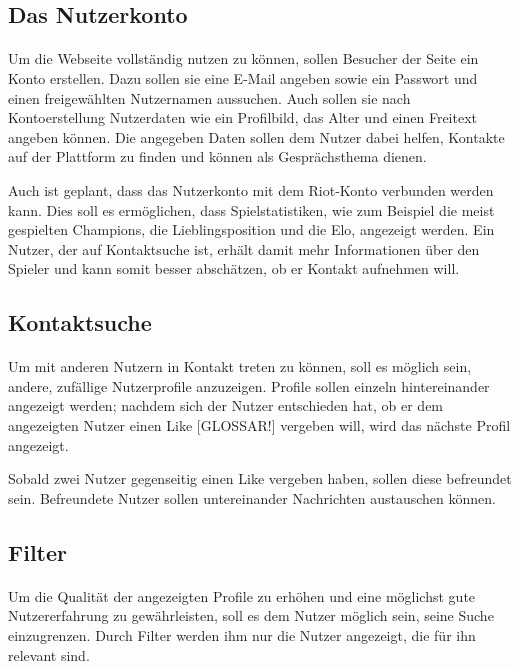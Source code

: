 \subsection{Das Nutzerkonto}
\paragraph{}
Um die Webseite vollständig nutzen zu können, sollen Besucher der Seite ein Konto erstellen. Dazu sollen sie eine E-Mail angeben sowie ein Passwort und einen freigewählten Nutzernamen aussuchen. Auch sollen sie nach Kontoerstellung Nutzerdaten wie ein Profilbild, das Alter und einen Freitext angeben können. Die angegeben Daten sollen dem Nutzer dabei helfen, Kontakte auf der Plattform zu finden und können als Gesprächsthema dienen.

Auch ist geplant, dass das Nutzerkonto mit dem Riot-Konto verbunden werden kann. Dies soll es ermöglichen, dass Spielstatistiken, wie zum Beispiel die meist gespielten Champions, die Lieblingsposition und die Elo, angezeigt werden. Ein Nutzer, der auf Kontaktsuche ist, erhält damit mehr Informationen über den Spieler und kann somit besser abschätzen, ob er Kontakt aufnehmen will. 

\subsection{Kontaktsuche}
\paragraph{}
Um mit anderen Nutzern in Kontakt treten zu können, soll es möglich sein, andere, zufällige Nutzerprofile anzuzeigen. Profile sollen einzeln hintereinander angezeigt werden; nachdem sich der Nutzer entschieden hat, ob er dem angezeigten Nutzer einen Like [GLOSSAR!] vergeben will, wird das nächste Profil angezeigt.

Sobald zwei Nutzer gegenseitig einen Like vergeben haben, sollen diese befreundet sein. Befreundete Nutzer sollen untereinander Nachrichten austauschen können.

\subsection{Filter}
\paragraph{}
Um die Qualität der angezeigten Profile zu erhöhen und eine möglichst gute Nutzererfahrung zu gewährleisten, soll es dem Nutzer möglich sein, seine Suche einzugrenzen. Durch Filter werden ihm nur die Nutzer angezeigt, die für ihn relevant sind.

